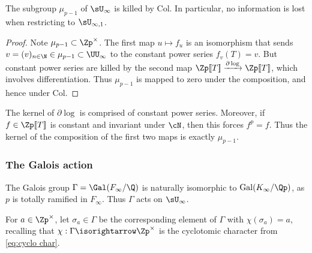 \documentclass[a4paper,10pt, english, reqno]{smfart}
\newcommand{\lsem}{[\! [}
\newcommand{\rsem}{]\! ]}
\newcommand{\GG}{\Gamma}
\numberwithin{equation}{section}
\begin{document}
\begin{lemma}
	The subgroup $\mu_{p-1}$ of $\sU_{\infty}$ is killed by $\mathrm{Col}$. In particular, no information is lost when restricting to $\sU_{\infty,1}$.
\end{lemma}
\begin{proof}
	Note $\mu_{p-1} \subset \Zp^\times$. The first map $u \mapsto f_u$ is an isomorphism that sends $v = (v)_{n \in \N} \in \mu_{p-1} \subset \UU_\infty$ to the constant power series $f_v(T) = v$. But constant power series are killed by the second map $\Zp\lsem T\rsem  \xrightarrow{\partial\log}\Zp\lsem T\rsem$, which involves differentiation. Thus $\mu_{p-1}$ is mapped to zero under the composition, and hence under $\mathrm{Col}$.
\end{proof}
\begin{remark}\label{rem:ker Delta}
	The kernel of $\partial \log$ is comprised of constant power series. Moreover, if $f \in \Zp\lsem T\rsem $ is constant and invariant under $\cN$, then this forces $f^p = f$. Thus the kernel of the composition of the first two maps is exactly $\mu_{p-1}$.
\end{remark}



\subsubsection{The Galois action}

	The Galois group $\GG = \Gal(F_\infty/\Q)$ is naturally isomorphic to $\mathrm{Gal}(K_\infty/\Qp)$, as $p$ is totally ramified in $F_\infty$. Thus $\Gamma$ acts on $\sU_\infty$. 
	
	

\begin{notation}
	For $a \in \Zp^\times$, let $\sigma_a \in \GG$ be the corresponding element of $\GG$ with $\chi(\sigma_a) = a$, recalling that $\chi : \GG \isorightarrow \Zp^\times$ is the cyclotomic character from \eqref{eq:cyclo char}.
\end{notation}
\end{document}
